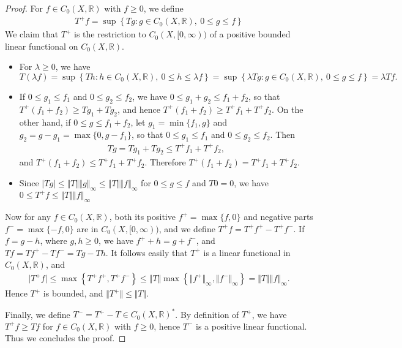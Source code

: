 \documentclass{article}
\numberwithin{equation}{section}
\newcommand{\bbR}{\mathbb{R}}
\theoremstyle{plain}
\theoremstyle{definition}
\begin{document}
\begin{proof}
	For $f\in C_0(X,\bbR)$ with $f\geq 0$, we define
	\begin{align*}
		T^+f=\sup\left\{Tg:g\in C_0(X,\bbR),\ 0\leq g\leq f\right\}
	\end{align*}
	We claim that $T^+$ is the restriction to $C_0(X,[0,\infty))$ of a positive bounded linear functional on $C_0(X,\bbR)$. 
	\begin{itemize}
		\item For $\lambda\geq 0$, we have $$T(\lambda f)=\sup\left\{Th:h\in C_0(X,\bbR),\ 0\leq h\leq\lambda f\right\}=\sup\left\{\lambda Tg:g\in C_0(X,\bbR),\ 0\leq g\leq f\right\}=\lambda Tf.$$
		\item If $0\leq g_1\leq f_1$ and $0\leq g_2\leq f_2$, we have $0\leq g_1+g_2\leq f_1+f_2$, so that $T^+(f_1+f_2)\geq Tg_1+Tg_2$, and hence $T^+(f_1+f_2)\geq T^+f_1+T^+f_2$. On the other hand, if $0\leq g\leq f_1+f_2$, let $g_1=\min\{f_1,g\}$ and $g_2=g-g_1=\max\{0,g-f_1\}$, so that $0\leq g_1\leq f_1$ and $0\leq g_2\leq f_2$. Then
		\begin{align*}
			Tg=Tg_1+Tg_2\leq T^+f_1+T^+f_2,
		\end{align*}
		and $T^+(f_1+f_2)\leq T^+f_1+T^+f_2$. Therefore $T^+(f_1+f_2)=T^+f_1+T^+f_2$.
		\item Since $\vert Tg\vert\leq\Vert T\Vert\left\Vert g\right\Vert_\infty\leq\Vert T\Vert\left\Vert f\right\Vert_\infty$ for $0\leq g\leq f$ and $T0=0$, we have $0\leq T^+f\leq\Vert T\Vert\left\Vert f\right\Vert_\infty$
	\end{itemize}
	
	Now for any $f\in C_0(X,\bbR)$, both its positive $f^+=\max\{f,0\}$ and negative parts $f^-=\max\{-f,0\}$ are in $C_0(X,[0,\infty))$, and we define
	$T^+f=T^+f^+-T^+f^-$. If $f=g-h$, where $g,h\geq 0$, we have $f^++h=g+f^-$, and $Tf=Tf^+-Tf^-=Tg-Th$. It follows easily that $T^+$ is a linear functional in $C_0(X,\bbR)$, and 
	\begin{align*}
		\vert T^+f\vert\leq\max\left\{T^+f^+,T^+f^-\right\}\leq\Vert T\Vert\max\left\{\Vert f^+\Vert_\infty,\Vert f^-\Vert_\infty\right\}=\Vert T\Vert\left\Vert f\right\Vert_\infty.
	\end{align*}
	Hence $T^+$ is bounded, and $\Vert T^+\Vert\leq\Vert T\Vert$.
	
	Finally, we define $T^-=T^+-T\in C_0(X,\bbR)^*$. By definition of $T^+$, we have $T^+f\geq Tf$ for $f\in C_0(X,\bbR)$ with $f\geq 0$, hence $T^-$ is a positive linear functional. Thus we concludes the proof.
\end{proof}
\end{document}
